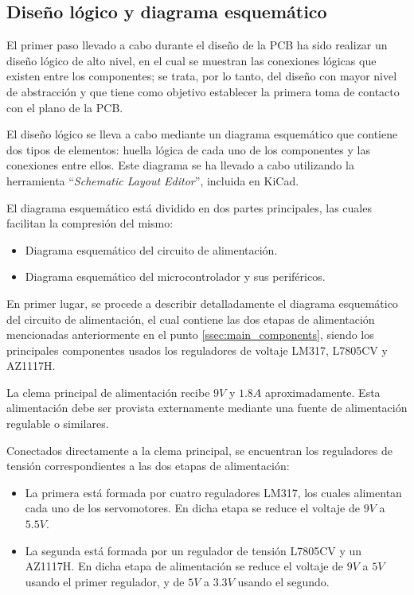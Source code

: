\subsection{Diseño lógico y diagrama esquemático}

El primer paso llevado a cabo durante el diseño de la \ac{PCB} ha sido realizar un diseño lógico de alto nivel, en el cual se muestran las conexiones lógicas que existen entre los componentes; se trata, por lo tanto, del diseño con mayor nivel de abstracción y que tiene como objetivo establecer la primera toma de contacto con el plano de la \ac{PCB}.

El diseño lógico se lleva a cabo mediante un diagrama esquemático que contiene dos tipos de elementos: huella lógica de cada uno de los componentes y las conexiones entre ellos. Este diagrama se ha llevado a cabo utilizando la herramienta ``\textit{Schematic Layout Editor}'', incluida en KiCad.

El diagrama esquemático está dividido en dos partes principales, las cuales facilitan la compresión del mismo:
\begin{itemize}
    \item Diagrama esquemático del circuito de alimentación.
    \item Diagrama esquemático del microcontrolador y sus periféricos.
\end{itemize}

En primer lugar, se procede a describir detalladamente el diagrama esquemático del circuito de alimentación, el cual contiene las dos etapas de alimentación mencionadas anteriormente en el punto \ref{ssec:main_components}, siendo los principales componentes usados los reguladores de voltaje LM317, L7805CV y AZ1117H.

La clema principal de alimentación recibe $9V$ y $1.8A$ aproximadamente. Esta alimentación debe ser provista externamente mediante una fuente de alimentación regulable o similares. 

Conectados directamente a la clema principal, se encuentran los reguladores de tensión correspondientes a las dos etapas de alimentación:
\begin{itemize}
    \item La primera está formada por cuatro reguladores LM317, los cuales alimentan cada uno de los servomotores. En dicha etapa se reduce el voltaje de $9V$ a $5.5V$.
    
    \item La segunda está formada por un regulador de tensión L7805CV y un AZ1117H. En dicha etapa de alimentación se reduce el voltaje de $9V$ a $5V$ usando el primer regulador, y de $5V$ a $3.3V$ usando el segundo.
\end{itemize}


